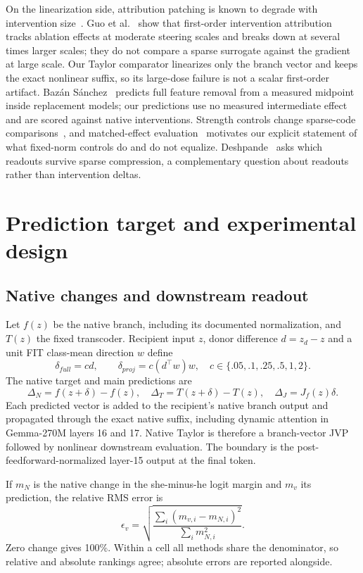 \documentclass[11pt]{article}
\begin{document}
On the linearization side, attribution patching is known to degrade with intervention size~\cite{syed2023,zhangwang2026}. Guo et al.~\cite{guo2026} show that first-order intervention attribution tracks ablation effects at moderate steering scales and breaks down at several times larger scales; they do not compare a sparse surrogate against the gradient at large scale. Our Taylor comparator linearizes only the branch vector and keeps the exact nonlinear suffix, so its large-dose failure is not a scalar first-order artifact. Bazán Sánchez~\cite{bazan2026} predicts full feature removal from a measured midpoint inside replacement models; our predictions use no measured intermediate effect and are scored against native interventions. Strength controls change sparse-code comparisons~\cite{zhang2026}, and matched-effect evaluation~\cite{luo2026} motivates our explicit statement of what fixed-norm controls do and do not equalize. Deshpande~\cite{deshpande2026} asks which readouts survive sparse compression, a complementary question about readouts rather than intervention deltas.

\section{Prediction target and experimental design}
\subsection{Native changes and downstream readout}
Let $f(z)$ be the native branch, including its documented normalization, and $T(z)$ the fixed transcoder. Recipient input $z$, donor difference $d=z_d-z$ and a unit FIT class-mean direction $w$ define
\[
 \delta_{full}=cd,\qquad \delta_{proj}=c(d^\top w)w,
 \quad c\in\{.05,.1,.25,.5,1,2\}.
\]
The native target and main predictions are
\[
 \Delta_N=f(z+\delta)-f(z),\quad
 \Delta_T=T(z+\delta)-T(z),\quad
 \Delta_J=J_f(z)\delta.
\]
Each predicted vector is added to the recipient's native branch output and propagated through the exact native suffix, including dynamic attention in Gemma-270M layers 16 and 17. Native Taylor is therefore a branch-vector JVP followed by nonlinear downstream evaluation. The boundary is the post-feedforward-normalized layer-15 output at the final token.

If $m_N$ is the native change in the she-minus-he logit margin and $m_v$ its prediction, the relative RMS error is
\[
 \epsilon_v=\sqrt{\frac{\sum_i(m_{v,i}-m_{N,i})^2}{\sum_i m_{N,i}^2}}.
\]
Zero change gives 100\%. Within a cell all methods share the denominator, so relative and absolute rankings agree; absolute errors are reported alongside.
\end{document}
